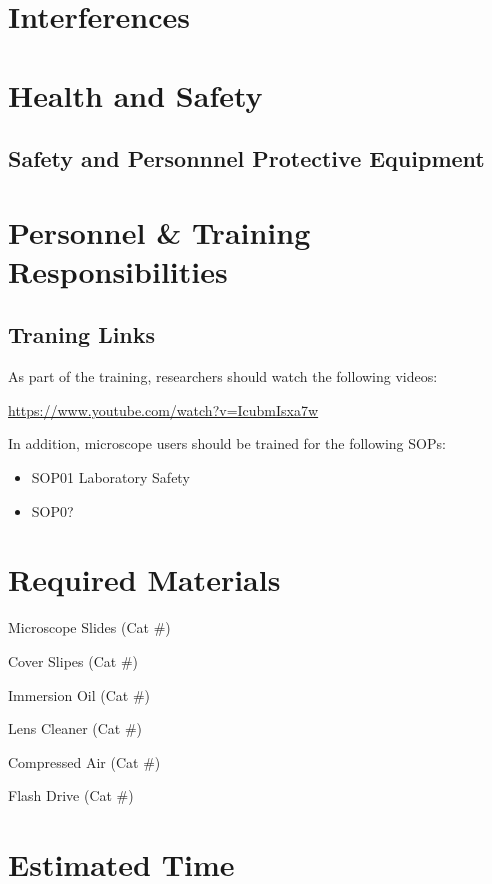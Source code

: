 \documentclass[12pt]{../SOP3_beta}
\begin{document}
\section{Interferences}

\section{Health and Safety}

\subsection*{Safety and Personnnel Protective Equipment}


\section{Personnel \& Training Responsibilities}

\subsection*{Traning Links}

As part of the training, researchers should watch the following videos: 

\href{Useful video}{https://www.youtube.com/watch?v=IcubmIsxa7w}

In addition, microscope users should be trained for the following SOPs:

\begin{itemize}
  \item SOP01 Laboratory Safety
  \item SOP0?
\end{itemize}

\section{Required Materials}

\NP Microscope Slides (Cat \#)

\NP Cover Slipes (Cat \#)

\NP Immersion Oil (Cat \#)

\NP Lens Cleaner (Cat \#)

\NP Compressed Air (Cat \#)

\NP Flash Drive (Cat \#)

\section{Estimated Time}
\end{document}
